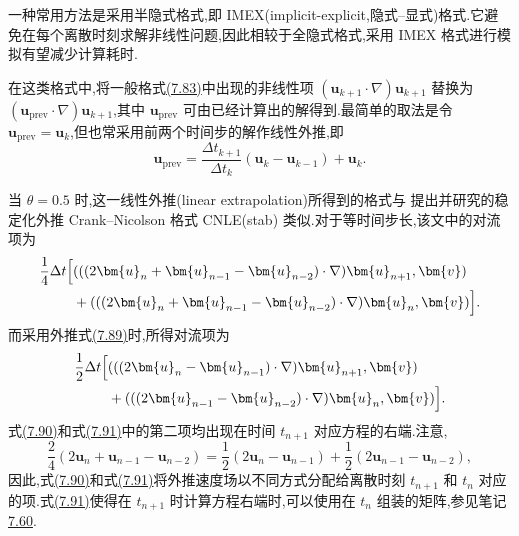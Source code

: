 \begin{note}
\label{note:imex-schemes}\label{note:oseen-semi-implicit}
一种常用方法是采用半隐式格式,即 IMEX(implicit-explicit,隐式--显式)格式.它避免在每个离散时刻求解非线性问题,因此相较于全隐式格式,采用 IMEX 格式进行模拟有望减少计算耗时.

在这类格式中,将一般格式\hyperref[eq:general-theta-scheme]{(7.83)}中出现的非线性项 $(\bm{u}_{k+1}\cdot\nabla)\bm{u}_{k+1}$ 替换为 $(\bm{u}_{\mathrm{prev}}\cdot\nabla)\bm{u}_{k+1}$,其中 $\bm{u}_{\mathrm{prev}}$ 可由已经计算出的解得到.最简单的取法是令 $\bm{u}_{\mathrm{prev}}=\bm{u}_k$,但也常采用前两个时间步的解作线性外推,即
\begin{equation}\label{eq:linear-velocity-extrapolation}
  \bm{u}_{\mathrm{prev}}
  =\frac{\Delta t_{k+1}}{\Delta t_k}
    (\bm{u}_k-\bm{u}_{k-1})+\bm{u}_k.
\end{equation}

当 $\theta=0.5$ 时,这一线性外推(linear extrapolation)所得到的格式与 \textcite{Ingram2013a} 提出并研究的稳定化外推 Crank--Nicolson 格式 CNLE(stab) 类似.对于等时间步长,该文中的对流项为
\begin{equation}\label{eq:cnle-stabilized-convective-term}
\begin{aligned}
  \frac{1}{4}\Delta t\Bigl[
    &(((2\bm{u}_n+\bm{u}_{n-1}-\bm{u}_{n-2})
       \cdot\nabla)\bm{u}_{n+1},\bm{v})\\
    &+(( (2\bm{u}_n+\bm{u}_{n-1}-\bm{u}_{n-2})
       \cdot\nabla)\bm{u}_{n},\bm{v})
  \Bigr].
\end{aligned}
\end{equation}
而采用外推式\hyperref[eq:linear-velocity-extrapolation]{(7.89)}时,所得对流项为
\begin{equation}\label{eq:imex-cnle-convective-term}
\begin{aligned}
  \frac{1}{2}\Delta t\Bigl[
    &(((2\bm{u}_n-\bm{u}_{n-1})
       \cdot\nabla)\bm{u}_{n+1},\bm{v})\\
    &+(( (2\bm{u}_{n-1}-\bm{u}_{n-2})
       \cdot\nabla)\bm{u}_{n},\bm{v})
  \Bigr].
\end{aligned}
\end{equation}
式\hyperref[eq:cnle-stabilized-convective-term]{(7.90)}和式\hyperref[eq:imex-cnle-convective-term]{(7.91)}中的第二项均出现在时间 $t_{n+1}$ 对应方程的右端.注意,
\[
  \frac{2}{4}(2\bm{u}_n+\bm{u}_{n-1}-\bm{u}_{n-2})
  =\frac{1}{2}(2\bm{u}_n-\bm{u}_{n-1})
   +\frac{1}{2}(2\bm{u}_{n-1}-\bm{u}_{n-2}),
\]
因此,式\hyperref[eq:cnle-stabilized-convective-term]{(7.90)}和式\hyperref[eq:imex-cnle-convective-term]{(7.91)}将外推速度场以不同方式分配给离散时刻 $t_{n+1}$ 和 $t_n$ 对应的项.式\hyperref[eq:imex-cnle-convective-term]{(7.91)}使得在 $t_{n+1}$ 时计算方程右端时,可以使用在 $t_n$ 组装的矩阵,参见笔记\hyperref[note:theta-scheme-implementation]{7.60}.
\end{note}

